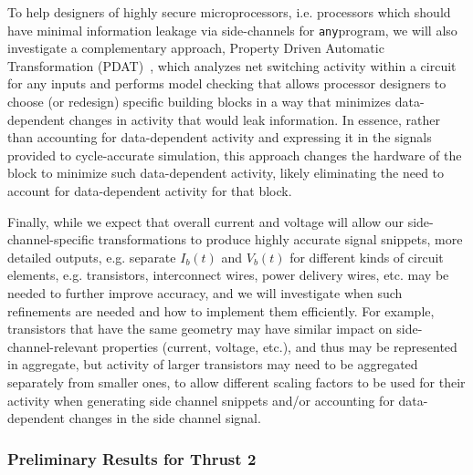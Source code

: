To help designers of highly secure microprocessors, i.e. processors which should have minimal information leakage via side-channels for {\tt any}program, we will also investigate a complementary approach, Property Driven Automatic Transformation (PDAT)~\cite{bleier21}, which analyzes net switching activity within a circuit for any inputs and performs model checking that allows processor designers to choose (or redesign) specific building blocks in a way that minimizes data-dependent changes in activity that would leak information. In essence, rather than accounting for data-dependent activity and expressing it in the signals provided to cycle-accurate simulation, this approach changes the hardware of the block to minimize such data-dependent activity, likely eliminating the need to account for data-dependent activity for that block.

Finally, while we expect that overall current and voltage will allow our side-channel-specific transformations to produce highly accurate signal snippets, more detailed outputs, e.g. separate $I_b(t)$ and $V_b(t)$ for different kinds of circuit elements, e.g. transistors, interconnect wires, power delivery wires, etc. may be needed to further improve accuracy, and we will investigate when such refinements are needed and how to implement them efficiently. For example, transistors that have the same geometry may have similar impact on side-channel-relevant properties (current, voltage, etc.), and thus may be represented in aggregate, but activity of larger transistors may need to be aggregated separately from smaller ones, to allow different scaling factors to be used for their activity when generating side channel snippets and/or accounting for data-dependent changes in the side channel signal.

\subsubsection{Preliminary Results for Thrust 2}

